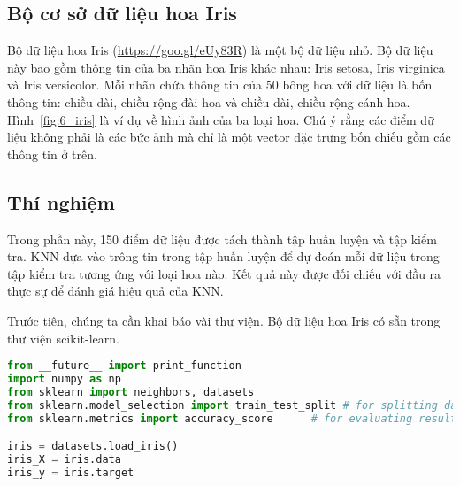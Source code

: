 \subsection{Bộ cơ sở dữ liệu hoa Iris}

Bộ dữ liệu hoa Iris (\url{https://goo.gl/eUy83R}) là một bộ dữ liệu nhỏ. Bộ dữ
liệu này bao gồm thông tin của ba nhãn hoa Iris khác nhau: Iris setosa, Iris
virginica và Iris versicolor. Mỗi nhãn chứa thông tin của 50 bông hoa với dữ
liệu là bốn thông tin: chiều dài, chiều rộng đài hoa và chiều dài,
chiều rộng cánh hoa. Hình~\ref{fig:6_iris} là ví dụ về hình ảnh của ba
loại hoa. Chú ý rằng các điểm dữ liệu không phải là các bức ảnh mà chỉ là một
vector đặc trưng bốn chiếu gồm các thông tin ở trên.






\subsection{Thí nghiệm}


Trong phần này, 150 điểm dữ liệu được tách thành tập huấn luyện và tập kiểm tra.
KNN dựa vào trông tin trong tập huấn luyện để dự đoán mỗi dữ liệu trong tập kiểm
tra tương ứng với loại hoa nào. Kết quả này được đối chiếu với đầu ra thực sự
để đánh giá hiệu quả của KNN.

Trước tiên, chúng ta cần khai báo vài thư viện. Bộ dữ liệu hoa Iris có sẵn trong
thư viện scikit-learn.

\begin{lstlisting}[language=Python]
from __future__ import print_function
import numpy as np
from sklearn import neighbors, datasets
from sklearn.model_selection import train_test_split # for splitting data
from sklearn.metrics import accuracy_score      # for evaluating results

iris = datasets.load_iris()
iris_X = iris.data
iris_y = iris.target
\end{lstlisting}

